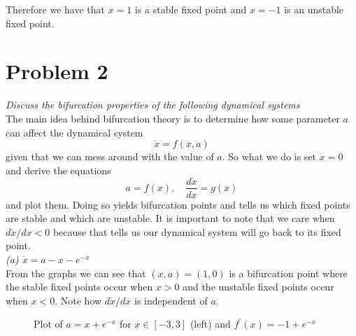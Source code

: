 \documentclass[12pt]{article}
\theoremstyle{remark}
\begin{document}
Therefore we have that $x = 1$ is a stable fixed point and $x = -1$ is an unstable fixed point.

\newpage

\section*{Problem 2}

\textit{Discuss the bifurcation properties of the following dynamical systems} \\

The main idea behind bifurcation theory is to determine how some parameter $a$ can affect the dynamical system $$ \dot{x} = f(x,a) $$
given that we can mess around with the value of $a$. So what we do is set $\dot{x} = 0$ and derive the equations 
$$ a = f(x), \quad \frac{d\dot{x}}{dx} = g(x) $$
and plot them. Doing so yields bifurcation points and tells us which fixed points are stable and which are unstable. It is important to note that we care when $d\dot{x}/dx < 0$ because that tells us our dynamical system will go back to its fixed point. \\

\textit{(a) $\dot{x} = a - x - e^{-x}$} \\

From the graphs we can see that $(x,a) = (1,0)$ is a bifurcation point where the stable fixed points occur when $x > 0$ and the unstable fixed points occur when $x < 0$. Note how $d\dot{x}/dx$ is independent of $a$.

\begin{figure}[H]
	\centering
	\caption{Plot of $a = x + e^{-x}$ for $x \in [-3,3]$ (left) and $f^\prime(x) = -1 + e^{-x}$}
\end{figure}
\end{document}
